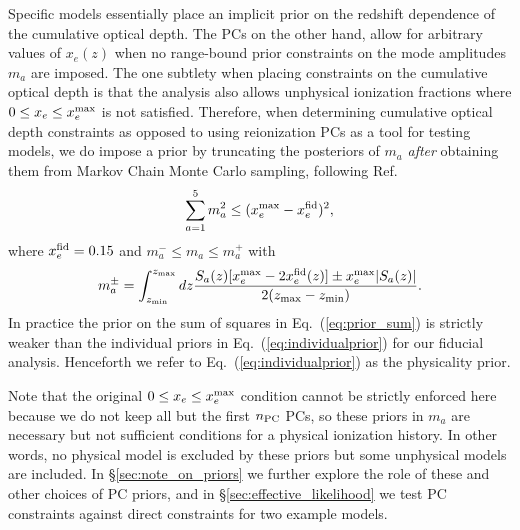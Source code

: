 \documentclass[prd,twocolumn,amsmath,amssymb,floatfix,superscriptaddress,nofootinbib]{revtex4-1}
\newcommand{\wh}[1]{\textcolor{blue}{#1}}
\begin{document}
Specific models essentially place an implicit prior on the redshift dependence of the cumulative optical depth.  
The PCs on the other hand, allow for arbitrary values of $x_e(z)$ when no range-bound prior constraints on the mode amplitudes $m_a$ are imposed. The one subtlety when placing constraints on the cumulative optical depth is that the analysis also allows
unphysical ionization fractions where $0 \le x_e \le x_e^{\rm max}$  is not satisfied.
Therefore, when determining cumulative optical depth constraints as opposed to using reionization PCs as a tool for testing models,
 we do impose a  prior
 by truncating the posteriors of $m_a$
 {\it after} obtaining them from Markov Chain Monte Carlo sampling, following Ref.~\cite{Mortonson:2008rx}
%
\begin{equation}
\sum_{a=1}^5 m_a^2 \le (x_e^{\rm max}-x_e^{\rm fid})^2,
\label{eq:prior_sum}
\end{equation}
where $x_e^{\rm fid}=0.15$ and $m_a^{-} \le m_a \le m_a^{+}$ with
\begin{equation}
m_a^{\pm} = \int_{z_{\rm min}}^{z_{\rm max} } dz \frac{S_a(z)[x_e^{\rm max} -2 x_e^{\rm fid}(z)]
\pm x_e^{\rm max} | S_a(z)|}{2(z_{\rm max}-z_{\rm min})}.
\label{eq:individualprior}
\end{equation}
In practice the prior on the sum of squares in Eq.~(\ref{eq:prior_sum}) is strictly weaker than the individual priors in Eq.~(\ref{eq:individualprior}) for
our fiducial analysis.  Henceforth we refer to Eq.~(\ref{eq:individualprior}) as the physicality prior.

%
Note that the original $0\le x_e \le x_e^{\rm max}$ condition cannot be strictly enforced here because we do not keep all but the first $n_{\rm PC}$ PCs, so these priors in $m_a$ are necessary but not sufficient conditions for a physical ionization history.  
In other words, no physical model is excluded by these priors but some unphysical models are included.  In \S \ref{sec:note_on_priors} we further explore the role of these and other choices of PC priors, and in \S\ref{sec:effective_likelihood} we test PC constraints against direct constraints for two example models.  
\end{document}
